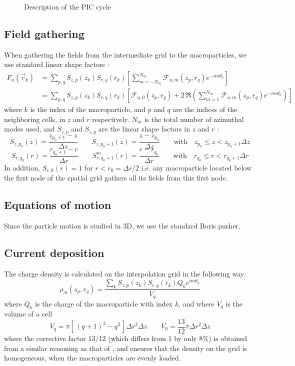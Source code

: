 \documentclass[a4paper]{article}   	%
\begin{document}
\begin{figure}

\caption{Description of the PIC cycle \label{fig:GlobalScheme}}
\end{figure}

\subsection{Field gathering}

When gathering the fields from the intermediate grid to the macroparticles,
we use standard linear shape factors :
\begin{align} 
F_u(\vec{r}_k) &=  \sum_{p,q} S_{z,p}(z_k)S_{r,q}(r_k) \left[ \sum_{m=-N_m}^{N_m} \mathcal{F}_{u,m}(z_p, r_q)
  e^{-im\theta_k} \right] \\
& = \sum_{p,q} S_{z,p}(z_k)S_{r,q}(r_k) \left[ \mathcal{F}_{u,0}(z_p,
  r_q) + 2\,\Re \left( \sum_{m=1}^{N_m} \mathcal{F}_{u,m}(z_p, r_q)
  e^{-im\theta_k} \right) \right]
\end{align}
where $k$ is the index of the macroparticle, and $p$ and $q$ are the
indices of the neighboring cells, in $z$ and $r$ respectively. $N_m$ is the total number
of azimuthal modes used, and $S_{z,p}$ and $S_{z,q}$ are the linear
shape factors in $z$ and $r$ :
\[ S_{z,p_0}(z) = \frac{z_{p_0+1}- z}{\Delta z}  \qquad 
S_{z,p_0 +1}(z) = \frac{ z - z_{p_0} }{\Delta z} \qquad
\mathrm{with} \quad z_{p_0} \leq z < z_{p_0 +1} \Delta z \]
\[ S_{r,q_0}(r) = \frac{ r_{q_0+1} - r }{  \Delta r }
\qquad S^m_{r,q_0+1}(r) = \frac{ r - r_{q_0} }{  \Delta r }
\qquad \mathrm{with} \quad r_{q_0} \leq r < r_{q_0+1}
\Delta r \]
In addition, $S_{r,0}(r) = 1$ for $r< r_0 = \Delta r/2$ i.e. any macroparticle
located below the first node of the spatial grid gathers all its
fields from this first node.

\subsection{Equations of motion}

Since the particle motion is studied in 3D, we use the standard Boris pusher.

\subsection{Current deposition}

The charge density is calculated on the interpolation grid in the
following way:
\[ \mathcal{\rho}_m(z_p,r_q) = \frac{ \sum_k  S_{z,p}(z_k)S_{r,q}(r_k) Q_k e^{im\theta_k}}{V_{q}} \]
where $Q_k$ is the charge of the macroparticle with index $k$, and
where $V_q$ is the volume of a cell
\[ V_{q} = \pi [\, (q+1)^2- q^2\,] \Delta r^2 \Delta z  \qquad
V_{0} = \frac{13}{12}\pi \Delta r^2 \Delta z \]
where the corrective factor 13/12 (which differs from 1 by only 8\%)
is obtained from a similar reasoning as that of \cite{Verboncoeur},
and ensures that the density on the grid is homogeneous, when 
the macroparticles are evenly loaded.
\end{document}
